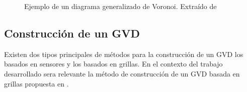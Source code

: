 \begin{figure}[H]
  \centering
  \qquad
  \caption{Ejemplo de un diagrama generalizado de Voronoi. Extraído de \cite{Wallgrun2005}}
  \label{cleanup}
\end{figure}

\subsection{Construcción de un GVD}\label{subsec:constGVD}
Existen dos tipos principales de métodos para la construcción de un GVD los basados en sensores y los basados en grillas. En el contexto del trabajo desarrollado sera relevante la método de construcción de un GVD basada en grillas propuesta en \cite{wurm2008coordinated}. 

